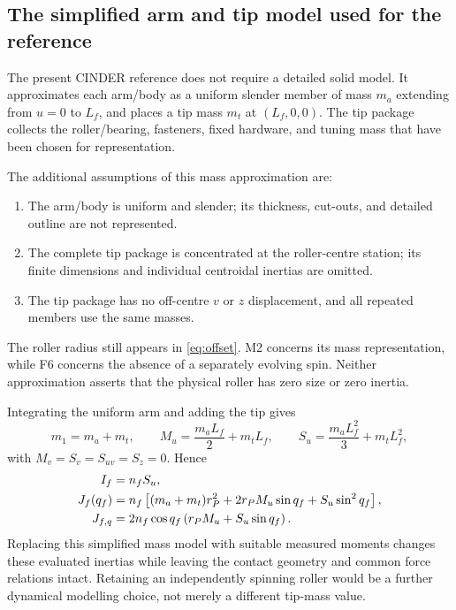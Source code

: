 \documentclass[11pt,letterpaper]{article}
\numberwithin{equation}{section}
\begin{document}
\subsection{The simplified arm and tip model used for the reference}
\label{sec:mass-approx}

The present CINDER reference does not require a detailed solid model. It approximates each arm/body as a uniform slender member of mass $m_a$ extending from $u=0$ to $L_f$, and places a tip mass $m_t$ at $(L_f,0,0)$. The tip package collects the roller/bearing, fasteners, fixed hardware, and tuning mass that have been chosen for representation.

The additional assumptions of this mass approximation are:

\begin{enumerate}[label=M\arabic*.,leftmargin=2.8em]
  \item The arm/body is uniform and slender; its thickness, cut-outs, and detailed outline are not represented.
  \item The complete tip package is concentrated at the roller-centre station; its finite dimensions and individual centroidal inertias are omitted.
  \item The tip package has no off-centre $v$ or $z$ displacement, and all repeated members use the same masses.
\end{enumerate}

The roller radius still appears in \cref{eq:offset}. M2 concerns its mass representation, while F6 concerns the absence of a separately evolving spin. Neither approximation asserts that the physical roller has zero size or zero inertia.

Integrating the uniform arm and adding the tip gives
\begin{equation}
  m_1=m_a+m_t,\qquad
  M_u=\frac{m_aL_f}{2}+m_tL_f,\qquad
  S_u=\frac{m_aL_f^2}{3}+m_tL_f^2,
  \label{eq:slender-moments}
\end{equation}
with $M_v=S_v=S_{uv}=S_z=0$. Hence
\begin{align}
  I_f&=n_fS_u,\notag\\
  J_f(q_f)&=n_f\left[(m_a+m_t)r_P^2
                           +2r_PM_u\sin q_f+S_u\sin^2q_f\right],\label{eq:slender-J}\\
  J_{f,q}&=2n_f\cos q_f\left(r_PM_u+S_u\sin q_f\right).\notag
\end{align}
Replacing this simplified mass model with suitable measured moments changes these evaluated inertias while leaving the contact geometry and common force relations intact. Retaining an independently spinning roller would be a further dynamical modelling choice, not merely a different tip-mass value.
\end{document}

